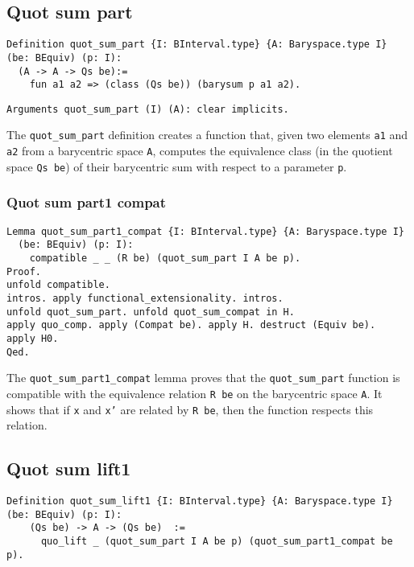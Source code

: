 \documentclass[a4paper,10pt]{article} %
\begin{document}
\subsection{Quot sum part}
\begin{lstlisting}
Definition quot_sum_part {I: BInterval.type} {A: Baryspace.type I} (be: BEquiv) (p: I): 
  (A -> A -> Qs be):=
    fun a1 a2 => (class (Qs be)) (barysum p a1 a2).
\end{lstlisting}

\begin{lstlisting}
Arguments quot_sum_part (I) (A): clear implicits.
\end{lstlisting}

The \texttt{quot\_sum\_part} definition creates a function that, given two elements \texttt{a1} and \texttt{a2} from a barycentric space \texttt{A}, computes the equivalence class (in the quotient space \texttt{Qs be}) of their barycentric sum with respect to a parameter \texttt{p}.

\subsubsection{Quot sum part1 compat}

\begin{lstlisting}
Lemma quot_sum_part1_compat {I: BInterval.type} {A: Baryspace.type I}
  (be: BEquiv) (p: I): 
    compatible _ _ (R be) (quot_sum_part I A be p). 
Proof.
unfold compatible. 
intros. apply functional_extensionality. intros. 
unfold quot_sum_part. unfold quot_sum_compat in H. 
apply quo_comp. apply (Compat be). apply H. destruct (Equiv be). 
apply H0. 
Qed.
\end{lstlisting}

The \texttt{quot\_sum\_part1\_compat} lemma proves that the \texttt{quot\_sum\_part} function is compatible with the equivalence relation \texttt{R be} on the barycentric space \texttt{A}. It shows that if \texttt{x} and \texttt{x'} are related by \texttt{R be}, then the function respects this relation.

\subsection{Quot sum lift1}
\begin{lstlisting}
Definition quot_sum_lift1 {I: BInterval.type} {A: Baryspace.type I} (be: BEquiv) (p: I): 
    (Qs be) -> A -> (Qs be)  := 
      quo_lift _ (quot_sum_part I A be p) (quot_sum_part1_compat be p).
\end{lstlisting}
\end{document}
